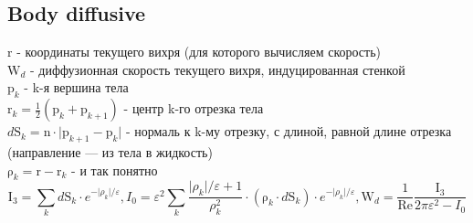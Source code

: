 \documentclass[14pt]{extreport}
\newcommand{\br}[1]{\boldsymbol{\mathrm{#1}}}
\newcommand{\Reyn}{\text{Re}}
\begin{document}
\begin{center}\setlength\fboxsep{0pt}
\setlength\fboxrule{0.5pt}
\end{center}

\subsection{Body diffusive}

$\br r$ - координаты текущего вихря (для которого вычисляем скорость) \\
$\br W_d$ - диффузионная скорость текущего вихря, индуцированная стенкой \\
$\br p_k$ - k-я вершина тела \\
$\br r_k = \frac{1}{2}(\br p_k + \br p_{k+1})$ - центр k-го отрезка тела \\
$d \br S_k = \br n \cdot\lvert\br p_{k+1} - \br p_k \rvert$ - нормаль к k-му отрезку, с длиной, равной длине отрезка (направление --- из тела в жидкость) \\
$\br{\rho}_k = \br r - \br r_k$ - и так понятно \\

\begin{equation*}
\br I_3 = {\sum\limits_k d\br S_k\cdot e^{-\lvert\rho_k\rvert/\varepsilon}},
I_0 = {\varepsilon^2\sum\limits_k \dfrac{\lvert\rho_k\rvert /\varepsilon +1}{\rho_k^2}
\cdot(\br\rho_k \cdot d\br S_k)\cdot e^{-\lvert\rho_k\rvert/\varepsilon}},
\br W_d = \dfrac{1}{\Reyn} \dfrac{\br I_3}{2\pi\varepsilon^2 - I_0}
\end{equation*}
\end{document}
